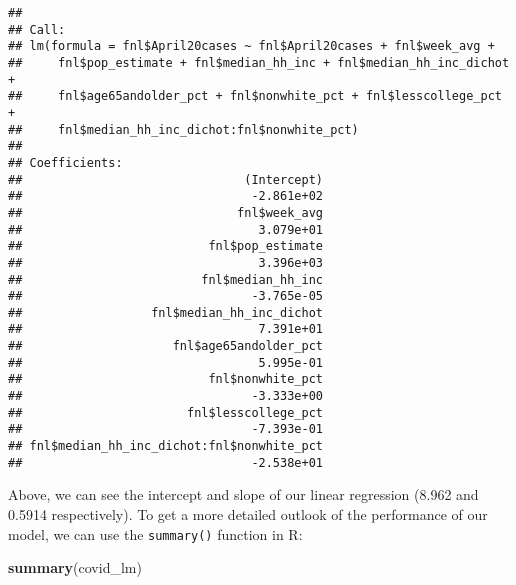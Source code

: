 \documentclass[
]{article}
\newenvironment{Shaded}{\begin{snugshade}}{\end{snugshade}}
\newcommand{\KeywordTok}[1]{\textcolor[rgb]{0.13,0.29,0.53}{\textbf{#1}}}
\newcommand{\NormalTok}[1]{#1}
\begin{document}
\begin{verbatim}
## 
## Call:
## lm(formula = fnl$April20cases ~ fnl$April20cases + fnl$week_avg + 
##     fnl$pop_estimate + fnl$median_hh_inc + fnl$median_hh_inc_dichot + 
##     fnl$age65andolder_pct + fnl$nonwhite_pct + fnl$lesscollege_pct + 
##     fnl$median_hh_inc_dichot:fnl$nonwhite_pct)
## 
## Coefficients:
##                               (Intercept)  
##                                -2.861e+02  
##                              fnl$week_avg  
##                                 3.079e+01  
##                          fnl$pop_estimate  
##                                 3.396e+03  
##                         fnl$median_hh_inc  
##                                -3.765e-05  
##                  fnl$median_hh_inc_dichot  
##                                 7.391e+01  
##                     fnl$age65andolder_pct  
##                                 5.995e-01  
##                          fnl$nonwhite_pct  
##                                -3.333e+00  
##                       fnl$lesscollege_pct  
##                                -7.393e-01  
## fnl$median_hh_inc_dichot:fnl$nonwhite_pct  
##                                -2.538e+01
\end{verbatim}

Above, we can see the intercept and slope of our linear regression
(8.962 and 0.5914 respectively). To get a more detailed outlook of the
performance of our model, we can use the \texttt{summary()} function in
R:

\begin{Shaded}
\begin{Highlighting}[]
\KeywordTok{summary}\NormalTok{(covid_lm)}
\end{Highlighting}
\end{Shaded}
\end{document}
